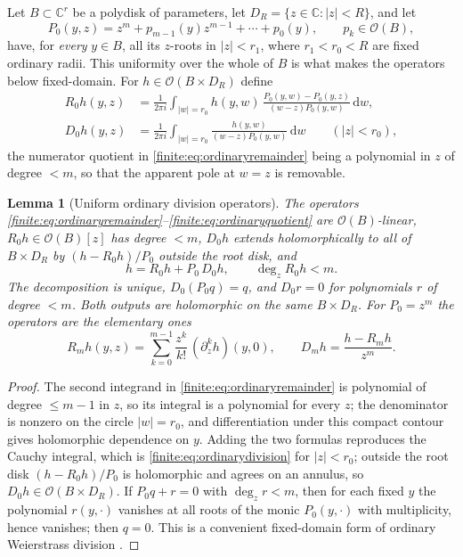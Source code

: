 \documentclass[11pt,letterpaper]{article}
\newtheorem{lemma}[theorem]{Lemma}
\theoremstyle{definition}
\theoremstyle{remark}
\newcommand{\C}{\mathbb C}
\newcommand{\OO}{\mathcal O}
\newcommand{\dd}{\mathrm d}
\numberwithin{equation}{section}
\begin{document}
Let $B\subset\C^r$ be a polydisk of parameters, let $D_R=\{z\in\C:|z|<R\}$, and let
\[
 P_0(y,z)=z^m+p_{m-1}(y)z^{m-1}+\cdots+p_0(y),
 \qquad p_k\in\OO(B),
\]
have, for \emph{every} $y\in B$, all its $z$-roots in $|z|<r_1$, where $r_1<r_0<R$ are fixed ordinary radii. This uniformity over the whole of $B$ is what makes the operators below fixed-domain. For $h\in\OO(B\times D_R)$ define
\begin{align}
 R_0h(y,z)&=\frac1{2\pi i}\int_{|w|=r_0}
 h(y,w)\,\frac{P_0(y,w)-P_0(y,z)}{(w-z)P_0(y,w)}\,\dd w,
 \label{finite:eq:ordinaryremainder}\\
 D_0h(y,z)&=\frac1{2\pi i}\int_{|w|=r_0}
 \frac{h(y,w)}{(w-z)P_0(y,w)}\,\dd w
 \qquad(|z|<r_0),
 \label{finite:eq:ordinaryquotient}
\end{align}
the numerator quotient in \eqref{finite:eq:ordinaryremainder} being a polynomial in $z$ of degree $<m$, so that the apparent pole at $w=z$ is removable.

\begin{lemma}[Uniform ordinary division operators]
\label{finite:lem:ordinarydivision}
The operators \eqref{finite:eq:ordinaryremainder}--\eqref{finite:eq:ordinaryquotient} are $\OO(B)$-linear, $R_0h\in\OO(B)[z]$ has degree $<m$, $D_0h$ extends holomorphically to all of $B\times D_R$ by $(h-R_0h)/P_0$ outside the root disk, and
\begin{equation}\label{finite:eq:ordinarydivision}
 h=R_0h+P_0\,D_0h,\qquad \deg_zR_0h<m .
\end{equation}
The decomposition is unique, $D_0(P_0q)=q$, and $D_0r=0$ for polynomials $r$ of degree $<m$. Both outputs are holomorphic on the same $B\times D_R$. For $P_0=z^m$ the operators are the elementary ones
\begin{equation}\label{finite:eq:monomialoperators}
 R_mh(y,z)=\sum_{k=0}^{m-1}\frac{z^k}{k!}\,(\partial_z^kh)(y,0),
 \qquad
 D_mh=\frac{h-R_mh}{z^m}.
\end{equation}
\end{lemma}

\begin{proof}
The second integrand in \eqref{finite:eq:ordinaryremainder} is polynomial of degree $\leq m-1$ in $z$, so its integral is a polynomial for every $z$; the denominator is nonzero on the circle $|w|=r_0$, and differentiation under this compact contour gives holomorphic dependence on $y$. Adding the two formulas reproduces the Cauchy integral, which is \eqref{finite:eq:ordinarydivision} for $|z|<r_0$; outside the root disk $(h-R_0h)/P_0$ is holomorphic and agrees on an annulus, so $D_0h\in\OO(B\times D_R)$. If $P_0q+r=0$ with $\deg_zr<m$, then for each fixed $y$ the polynomial $r(y,\cdot)$ vanishes at all roots of the monic $P_0(y,\cdot)$ with multiplicity, hence vanishes; then $q=0$. This is a convenient fixed-domain form of ordinary Weierstrass division \cite{finite:GunningRossi,finite:Lebl}.
\end{proof}
\end{document}
